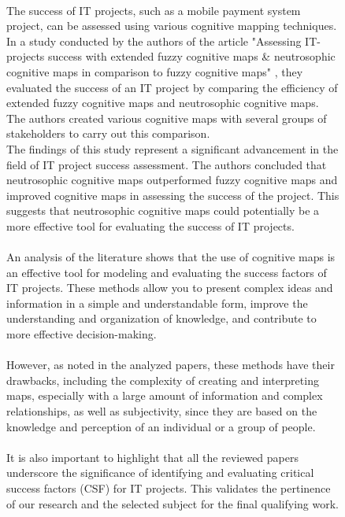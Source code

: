 \documentclass{article}
\begin{document}
\begin{figure}[!t]
\begin{minipage}{0.49\textwidth}
            ~\\
            The success of IT projects, such as a mobile payment system project, can be assessed using various cognitive mapping techniques.\\
            In a study conducted by the authors of the article "{}Assessing IT-projects success with extended fuzzy cognitive maps \& neutrosophic cognitive maps in comparison to fuzzy cognitive maps"{} \cite{litlink20}, they evaluated the success of an IT project by comparing the efficiency of extended fuzzy cognitive maps and neutrosophic cognitive maps. The authors created various cognitive maps with several groups of stakeholders to carry out this comparison.\\
            The findings of this study represent a significant advancement in the field of IT project success assessment. The authors concluded that neutrosophic cognitive maps outperformed fuzzy cognitive maps and improved cognitive maps in assessing the success of the project. This suggests that neutrosophic cognitive maps could potentially be a more effective tool for evaluating the success of IT projects.\\
            ~\\
            An analysis of the literature shows that the use of cognitive maps is an effective tool for modeling and evaluating the success factors of IT projects. These methods allow you to present complex ideas and information in a simple and understandable form, improve the understanding and organization of knowledge, and contribute to more effective decision-making.\\
            ~\\
            However, as noted in the analyzed papers, these methods have their drawbacks, including the complexity of creating and interpreting maps, especially with a large amount of information and complex relationships, as well as subjectivity, since they are based on the knowledge and perception of an individual or a group of people.\\
            ~\\
            It is also important to highlight that all the reviewed papers underscore the significance of identifying and evaluating critical success factors (CSF) for IT projects. This validates the pertinence of our research and the selected subject for the final qualifying work.\\
            ~\\
            ~\\

\end{minipage}
\end{figure}
\end{document}

